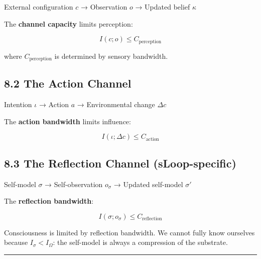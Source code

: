 \documentclass[
  11pt,
  letterpaper,
  twoside,
  openany]{book}
\makeatletter
\let\orig@subsection\subsection
\renewcommand{\subsection}{\needspace{6\baselineskip}\orig@subsection}
\makeatother
\begin{document}
External configuration \(c\) → Observation \(o\) → Updated belief
\(\kappa\)

The \textbf{channel capacity} limits perception:

\[I(c; o) \leq C_{\text{perception}}\]

where \(C_{\text{perception}}\) is determined by sensory bandwidth.

\subsection{8.2 The Action Channel}\label{the-action-channel}

Intention \(\iota\) → Action \(a\) → Environmental change \(\Delta c\)

The \textbf{action bandwidth} limits influence:

\[I(\iota; \Delta c) \leq C_{\text{action}}\]

\subsection{8.3 The Reflection Channel
(sLoop-specific)}\label{the-reflection-channel-sloop-specific}

Self-model \(\sigma\) → Self-observation \(o_\sigma\) → Updated
self-model \(\sigma'\)

The \textbf{reflection bandwidth}:

\[I(\sigma; o_\sigma) \leq C_{\text{reflection}}\]

\begin{tcolorbox}[enhanced jigsaw, colbacktitle=quarto-callout-important-color!10!white, titlerule=0mm, bottomtitle=1mm, bottomrule=.15mm, colback=white, arc=.35mm, breakable, toprule=.15mm, title=\textcolor{quarto-callout-important-color}{\faExclamation}\hspace{0.5em}{The sLoop Bottleneck}, rightrule=.15mm, coltitle=black, leftrule=.75mm, colframe=quarto-callout-important-color-frame, toptitle=1mm, opacityback=0, opacitybacktitle=0.6, left=2mm]

Consciousness is limited by reflection bandwidth. We cannot fully know
ourselves because \(I_\sigma < I_\Omega\): the self-model is always a
compression of the substrate.

\end{tcolorbox}

\begin{center}\rule{0.5\linewidth}{0.5pt}\end{center}
\end{document}
